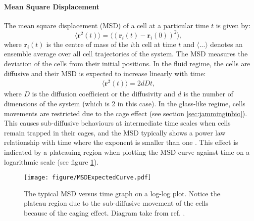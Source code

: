 \documentclass[a4paper,12pt]{article}
\begin{document}
\paragraph{Mean Square Displacement}
The mean square displacement (MSD) of a cell at a particular time $t$ is given by:
\begin{equation}
\langle{\bm{r}^2(t)\rangle} = \langle{\left(\bm{r}_i(t) - \bm{r}_i(0)\right)^2\rangle},
\end{equation}
where $\bm{r}_i (t)$ is the centre of mass of the $i$th cell at time $t$ and $\langle...\rangle$ denotes an ensemble average over all cell trajectories of the system. The MSD measures the deviation of the cells from their initial positions. In the fluid regime, the cells are diffusive and their MSD is expected to increase linearly with time:
\begin{eqnarray}
\langle{\bm{r}^2(t)\rangle} = 2dDt, 
\end{eqnarray}
where $D$ is the diffusion coefficient or the diffusivity and $d$ is the number of dimensions of the system (which is 2 in this case). In the glass-like regime, cells movements are restricted due to the cage effect (see section \ref{sec:jamminginbio}). This causes sub-diffusive behaviours at intermediate time scales when cells remain trapped in their cages, and the MSD typically shows a power law relationship with time where the exponent is smaller than one \cite{hofling2013}. This effect is indicated by a plateauing region when plotting the MSD curve against time on a logarithmic scale (see figure \ref{fig:MSDExpectedCurve}).
\begin{figure}[h]
\centering
\texttt{[image: figure/MSDExpectedCurve.pdf]}
\caption{The typical MSD versus time graph on a log-log plot. Notice the plateau region due to the sub-diffusive movement of the cells because of the caging effect. Diagram take from ref. \cite{hofling2013}.}
\label{fig:MSDExpectedCurve}
\end{figure}
\end{document}
